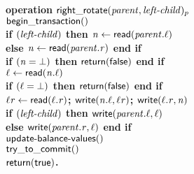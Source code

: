 \begin{figure}[h!]
{{\begin{minipage}[t]{150mm}
\begin{tabbing}
   		
\bf{operation} $\act{right\_rotate}(\ms{parent}, \ms{left-child})_p$ \\
		 \> $\lit{begin\_transaction}()$ \\
		 \> \bf{if} $(\ms{left-child})$ \bf{then} $\ms{n} \gets \lit{read}(\ms{parent.\ell})$ \\
		 \>\> \bf{else} $\ms{n} \gets \lit{read}(\ms{parent.r})$ \bf{end if} \\
		 \> \bf{if} $(\ms{n = \bot})$ {\bf then} ${\sf return}(\lit{false})$  \bf{end if} \\
		 \> $\ms{\ell} \gets \lit{read}(\ms{n.\ell})$ \\
		 \> \bf{if} $(\ms{\ell = \bot})$ \bf{then} ${\sf return}(\lit{false})$ \bf{end if} \\
		 \> $\ms{\ell{}r} \gets \lit{read}(\ms{\ell.r})$; $\lit{write}(\ms{n.\ell}, \ms{\ell{}r})$; $\lit{write}(\ms{\ell.r}, \ms{n})$ \\
		 \> \bf{if} $(\ms{left-child})$ \bf{then} $\lit{write}(\ms{parent.\ell}, \ell)$ \\
		 \>\> \bf{else} $\lit{write}(\ms{parent.r}, \ms{\ell})$ \bf{end if} \\
		 \> $\act{update-balance-values()}$ \\%
		 \> $\lit{try\_to\_commit}()$ \\
		 \> $\sf{return}(\lit{true})$. \\
		



\end{tabbing}
\end{minipage}}}
\end{figure}
